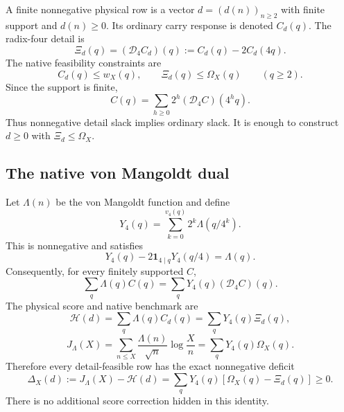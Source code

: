 \documentclass[11pt]{article}
\newcommand{\Dfour}{\mathcal D_4}
\newcommand{\Xirow}{\Xi}
\newcommand{\Om}{\Omega}
\newcommand{\Yfour}{Y_4}
\newcommand{\Jnat}{J_\Lambda}
\newcommand{\Hscore}{\mathcal H}
\newcommand{\Lam}{\Lambda}
\newcommand{\one}{\mathbf 1}
\begin{document}
A finite nonnegative physical row is a vector $d=(d(n))_{n\ge2}$ with finite support and $d(n)\ge0$. Its ordinary carry response is denoted $C_d(q)$. The radix-four detail is
\begin{equation}
 \Xirow_d(q)=(\Dfour C_d)(q):=C_d(q)-2C_d(4q).
 \label{eq:detail-def}
\end{equation}
The native feasibility constraints are
\begin{equation}
 C_d(q)\le w_X(q),\qquad \Xirow_d(q)\le\Om_X(q)\qquad(q\ge2).
 \label{eq:feasibility}
\end{equation}
Since the support is finite,
\begin{equation}
 C(q)=\sum_{h\ge0}2^h(\Dfour C)(4^hq).
 \label{eq:positive-inverse}
\end{equation}
Thus nonnegative detail slack implies ordinary slack. It is enough to construct $d\ge0$ with $\Xirow_d\le\Om_X$.

\subsection{The native von Mangoldt dual}

Let $\Lam(n)$ be the von Mangoldt function and define
\begin{equation}
 \boxed{\Yfour(q)=\sum_{k=0}^{v_4(q)}2^k\Lam(q/4^k).}
 \label{eq:y4}
\end{equation}
This is nonnegative and satisfies
\begin{equation}
 \Yfour(q)-2\one_{4\mid q}\Yfour(q/4)=\Lam(q).
 \label{eq:y4-rec}
\end{equation}
Consequently, for every finitely supported $C$,
\begin{equation}
 \sum_q\Lam(q)C(q)=\sum_q\Yfour(q)(\Dfour C)(q).
 \label{eq:y4-sbp}
\end{equation}
The physical score and native benchmark are
\begin{equation}
 \Hscore(d)=\sum_q\Lam(q)C_d(q)=\sum_q\Yfour(q)\Xirow_d(q),
 \label{eq:score}
\end{equation}
\begin{equation}
 \Jnat(X)=\sum_{n\le X}\frac{\Lam(n)}{\sqrt n}\log\frac Xn
 =\sum_q\Yfour(q)\Om_X(q).
 \label{eq:benchmark}
\end{equation}
Therefore every detail-feasible row has the exact nonnegative deficit
\begin{equation}
 \boxed{
 \Delta_X(d):=\Jnat(X)-\Hscore(d)
 =\sum_q\Yfour(q)[\Om_X(q)-\Xirow_d(q)]\ge0.}
 \label{eq:deficit}
\end{equation}
There is no additional score correction hidden in this identity.
\end{document}
